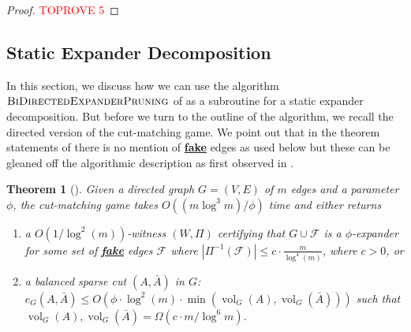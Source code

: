 \documentclass[11pt]{article}
\newtheorem{theorem}{Theorem}[section]
\DeclareMathOperator{\vol}{vol}
\begin{document}
\begin{proof}\textcolor{red}{TOPROVE 5}\end{proof}


\subsection{Static Expander Decomposition}
\label{subsec:staticExpDecom}
In this section, we discuss how we can use the algorithm $\textsc{BiDirectedExpanderPruning}$ of  as a subroutine for a static expander decomposition. But before we turn to the outline of the algorithm, we recall the directed version of the cut-matching game. We point out that in the theorem statements of \cite{khandekar2009graph,louis2010cut} there is no mention of \underline{\textbf{fake}} edges as used below but these can be gleaned off the algorithmic description as first observed in \cite{chuzhoy2020deterministic}.

\begin{theorem}[\cite{khandekar2009graph,louis2010cut}]\label{thm:CutMatching}
    Given a directed graph $G=(V, E)$ of $m$ edges and a parameter $\phi$, the cut-matching game takes $O((m \log^3 m) / \phi)$ time and either returns
    \begin{enumerate}
        \item \label{item:CM-thm1} a $O(1/\log^2(m))$-witness $(W, \Pi)$ certifying that $G \cup \mathcal{F}$ is a $\phi$-expander for some set of \underline{\textbf{fake}} edges $\mathcal{F}$ where $|\Pi^{-1}(\mathcal{F})| \leq c \cdot \frac{m}{\log^4(m)}$, where $c > 0$, or
        \item \label{item:CM-thm2} a balanced sparse cut $(A, \bar{A})$ in $G$: $e_G(A, \bar{A}) \leq O\left(\phi \cdot \log^2(m) \cdot \min(\vol_G(A) , \vol_G(\bar{A}))\right)$ such that $\vol_G(A), \vol_G(\bar{A}) = \Omega(c \cdot m/\log^6 m)$.
    \end{enumerate}
\end{theorem}
\end{document}
